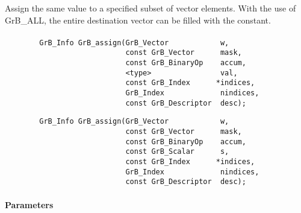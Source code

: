 Assign the same value to a specified subset of vector elements.  With the use of
{\sf GrB\_ALL}, the entire destination vector can be filled with the constant.

\paragraph{\syntax}

\begin{verbatim}
        GrB_Info GrB_assign(GrB_Vector            w,
                            const GrB_Vector      mask,
                            const GrB_BinaryOp    accum,
                            <type>                val,
                            const GrB_Index      *indices,
                            GrB_Index             nindices,
                            const GrB_Descriptor  desc);
\end{verbatim}

\begin{verbatim}
        GrB_Info GrB_assign(GrB_Vector            w,
                            const GrB_Vector      mask,
                            const GrB_BinaryOp    accum,
                            const GrB_Scalar      s,
                            const GrB_Index      *indices,
                            GrB_Index             nindices,
                            const GrB_Descriptor  desc);
\end{verbatim}

\paragraph{Parameters}

